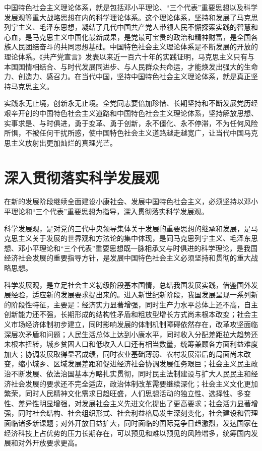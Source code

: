 中国特色社会主义理论体系，就是包括邓小平理论、“三个代表”重要思想以及科学发展观等重大战略思想在内的科学理论体系。这个理论体系，坚持和发展了马克思列宁主义、毛泽东思想，凝结了几代中国共产党人带领人民不懈探索实践的智慧和心血，是马克思主义中国化最新成果，是党最可宝贵的政治和精神财富，是全国各族人民团结奋斗的共同思想基础。中国特色社会主义理论体系是不断发展的开放的理论体系。《共产党宣言》发表以来近一百六十年的实践证明，马克思主义只有与本国国情相结合、与时代发展同进步、与人民群众共命运，才能焕发出强大的生命力、创造力、感召力。在当代中国，坚持中国特色社会主义理论体系，就是真正坚持马克思主义。

实践永无止境，创新永无止境。全党同志要倍加珍惜、长期坚持和不断发展党历经艰辛开创的中国特色社会主义道路和中国特色社会主义理论体系，坚持解放思想、实事求是、与时俱进，勇于变革、勇于创新，永不僵化、永不停滞，不为任何风险所惧，不被任何干扰所惑，使中国特色社会主义道路越走越宽广，让当代中国马克思主义放射出更加灿烂的真理光芒。

\section{深入贯彻落实科学发展观}

在新的发展阶段继续全面建设小康社会、发展中国特色社会主义，必须坚持以邓小平理论和“三个代表”重要思想为指导，深入贯彻落实科学发展观。

科学发展观，是对党的三代中央领导集体关于发展的重要思想的继承和发展，是马克思主义关于发展的世界观和方法论的集中体现，是同马克思列宁主义、毛泽东思想、邓小平理论和“三个代表”重要思想既一脉相承又与时俱进的科学理论，是我国经济社会发展的重要指导方针，是发展中国特色社会主义必须坚持和贯彻的重大战略思想。

科学发展观，是立足社会主义初级阶段基本国情，总结我国发展实践，借鉴国外发展经验，适应新的发展要求提出来的。进入新世纪新阶段，我国发展呈现一系列新的阶段性特征，主要是：经济实力显著增强，同时生产力水平总体上还不高，自主创新能力还不强，长期形成的结构性矛盾和粗放型增长方式尚未根本改变；社会主义市场经济体制初步建立，同时影响发展的体制机制障碍依然存在，改革攻坚面临深层次矛盾和问题；人民生活总体上达到小康水平，同时收入分配差距拉大趋势还未根本扭转，城乡贫困人口和低收入人口还有相当数量，统筹兼顾各方面利益难度加大；协调发展取得显著成绩，同时农业基础薄弱、农村发展滞后的局面尚未改变，缩小城乡、区域发展差距和促进经济社会协调发展任务艰巨；社会主义民主政治不断发展、依法治国基本方略扎实贯彻，同时民主法制建设与扩大人民民主和经济社会发展的要求还不完全适应，政治体制改革需要继续深化；社会主义文化更加繁荣，同时人民精神文化需求日趋旺盛，人们思想活动的独立性、选择性、多变性、差异性明显增强，对发展社会主义先进文化提出了更高要求；社会活力显著增强，同时社会结构、社会组织形式、社会利益格局发生深刻变化，社会建设和管理面临诸多新课题；对外开放日益扩大，同时面临的国际竞争日趋激烈，发达国家在经济科技上占优势的压力长期存在，可以预见和难以预见的风险增多，统筹国内发展和对外开放要求更高。

